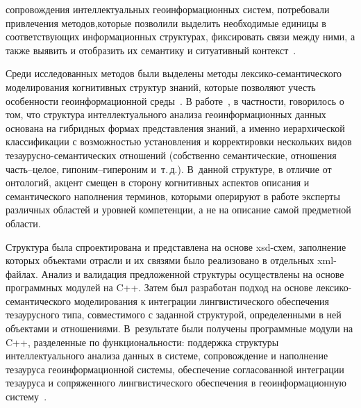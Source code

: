 \begin{multicols}{2}

\noindent
 сопровождения интеллектуальных 
геоинформационных сис\-тем, потребовали привлечения методов,\linebreak которые 
позволили выделить необходимые единицы в соответствующих 
информационных структурах, фиксировать связи между ними, а также 
выявить и отобразить их семантику и ситуативный контекст~\cite{24-ko}. 

Среди исследованных методов были выделены методы 
     лек\-си\-ко-се\-ман\-ти\-че\-ско\-го моделирования когнитивных 
структур знаний, которые позволяют учесть особенности 
геоинформационной среды~\cite{23-ko}.
     В работе~\cite{23-ko}, в частности, говорилось о том, что структура 
интеллектуального анализа геоинформационных данных основана на 
гибридных формах представления знаний, а именно иерархической 
классификации с возможностью установления и корректировки нескольких 
видов те\-зау\-рус\-но-се\-ман\-ти\-че\-ских отношений (собственно 
семантические, отношения часть--це\-лое, ги\-по\-ним--ги\-пе\-ро\-ним 
и~т.\,д.). В~данной структуре, в отличие от онтологий, акцент смещен в 
сторону когнитивных аспектов описания и семантического наполнения 
терминов, которыми оперируют в работе эксперты различных областей и 
уровней компетенции, а не на описание самой предметной области. 
     
     Структура была спроектирована и представлена на основе xsd-схем, 
заполнение которых объектами отрасли и их связями было реализовано в 
отдельных xml-фай\-лах. Анализ и валидация предложенной структуры 
осуществлены на основе программных модулей на C++. Затем был 
разработан подход на основе лек\-си\-ко-се\-ман\-ти\-че\-ско\-го 
моделирования к интеграции лингвистического обеспечения тезаурусного 
типа, совместимого с заданной структурой, определенными в ней объектами 
и отношениями. В~результате были получены программные модули на C++, 
разделенные по функциональности: поддержка структуры интеллектуального 
анализа данных в сис\-те\-ме, сопровождение и наполнение тезауруса 
геоинформационной сис\-те\-мы, обеспечение согласованной интеграции 
тезауруса и сопряженного лингвистического обеспечения в 
геоинформационную сис\-те\-му~\cite{23-ko}.
     

\end{multicols}
